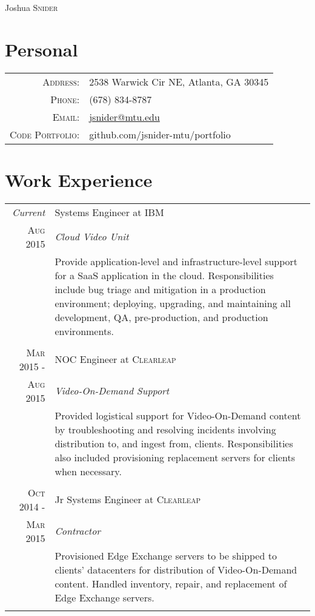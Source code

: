 \documentclass[a4paper,9pt]{extarticle}
\begin{document}
\pagestyle{empty}

\par{\centering
                {\Huge Joshua \textsc{Snider}
        }\bigskip\par}
\section{Personal}
\begin{tabular}{rl}
    \textsc{Address:}   & 2538 Warwick Cir NE, Atlanta, GA 30345\\
    \textsc{Phone:}     & (678) 834-8787\\
    \textsc{Email:}     & \href{mailto:jsnider@mtu.edu}{jsnider@mtu.edu}\\
    \textsc{Code Portfolio:} & github.com/jsnider-mtu/portfolio
    \multicolumn{2}{c}{}\\
\end{tabular}

\section{Work Experience}
\begin{tabular}{r|p{8.5cm}}
 \emph{Current}&Systems Engineer at \textsc{IBM}\\\textsc{Aug 2015}&\emph{Cloud Video Unit}\\&\footnotesize{Provide application-level and infrastructure-level support for a SaaS application in the cloud. Responsibilities include bug triage and mitigation in a production environment; deploying, upgrading, and maintaining all development, QA, pre-production, and production environments.}\\\multicolumn{2}{c}{}\\
 \textsc{Mar 2015 -}&NOC Engineer at \textsc{Clearleap}\\\textsc{Aug 2015}&\emph{Video-On-Demand Support}\\&\footnotesize{Provided logistical support for Video-On-Demand content by troubleshooting and resolving incidents involving distribution to, and ingest from, clients. Responsibilities also included provisioning replacement servers for clients when necessary.}\\\multicolumn{2}{c}{}\\
 \textsc{Oct 2014 -}&Jr Systems Engineer at \textsc{Clearleap}\\\textsc{Mar 2015}&\emph{Contractor}\\&\footnotesize{Provisioned Edge Exchange servers to be shipped to clients' datacenters for distribution of Video-On-Demand content. Handled inventory, repair, and replacement of Edge Exchange servers.}\\\multicolumn{2}{c}{}\\
\end{tabular}
\end{document}
